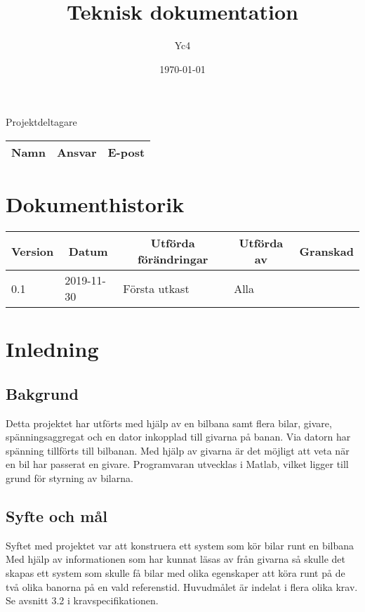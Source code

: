\documentclass[10pt,oneside,swedish]{lips-no_customer}
\title{Teknisk dokumentation}
\author{Yc4}
\date{\today}
\begin{document}
\maketitle

\cleardoublepage
\makeprojectid

\begin{center}
  \Large Projektdeltagare
\end{center}
\begin{center}
  \begin{tabular}{|l|l|l|}
    \hline
    \textbf{Namn} & \textbf{Ansvar} & \textbf{E-post}\\
    \hline
  \end{tabular}
\end{center}

\section*{Dokumenthistorik}
\begin{tabular}{p{}|p{}|p{}|p{}|p{}} 
  \multicolumn{1}{c}{\bfseries Version} & 
  \multicolumn{1}{|c}{\bfseries Datum} & 
  \multicolumn{1}{|c}{\bfseries Utförda förändringar} & 
  \multicolumn{1}{|c}{\bfseries Utförda av} & 
  \multicolumn{1}{|c}{\bfseries Granskad}\\
  \hline
  \hline
  0.1 & 2019-11-30 & Första utkast & Alla & \\
  \hline
\end{tabular}

\cleardoublepage
{}\cfoot{\thepage}


\cleardoublepage
\tableofcontents
\cleardoublepage

\section{Inledning}
\subsection{Bakgrund}
Detta projektet har utförts med hjälp av en bilbana samt flera bilar, givare, spänningsaggregat och en dator inkopplad till givarna på banan. Via datorn har spänning tillförts till bilbanan. Med hjälp av givarna är det möjligt att veta när en bil har passerat en givare. Programvaran utvecklas i Matlab, vilket ligger till grund för styrning av bilarna. 
\subsection{Syfte och mål}
Syftet med projektet var att konstruera ett system som kör bilar runt en bilbana
Med hjälp av informationen som har kunnat läsas av från givarna så skulle det
skapas ett system som skulle få bilar med olika egenskaper att köra runt på de två olika 
banorna på en vald referenstid. Huvudmålet är indelat i flera olika krav.
Se avsnitt 3.2 i kravspecifikationen.
\end{document}
